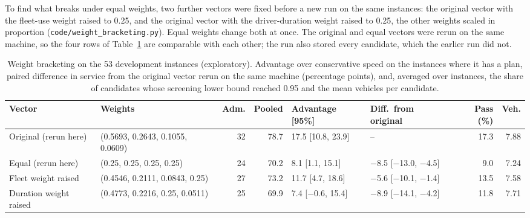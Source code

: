 To find what breaks under equal weights, two further vectors were fixed before a new run on the same instances: the original vector with the fleet-use weight raised to 0.25, and the original vector with the driver-duration weight raised to 0.25, the other weights scaled in proportion (\texttt{code/weight\_bracketing.py}). Equal weights change both at once. The original and equal vectors were rerun on the same machine, so the four rows of Table~\ref{tab:bracket} are comparable with each other; the run also stored every candidate, which the earlier run did not.

\begin{table}[htbp]
\centering
\scriptsize
\setlength{\tabcolsep}{4pt}
\caption{Weight bracketing on the 53 development instances (exploratory). Advantage over conservative speed on the instances where it has a plan, paired difference in service from the original vector rerun on the same machine (percentage points), and, averaged over instances, the share of candidates whose screening lower bound reached 0.95 and the mean vehicles per candidate.}
\label{tab:bracket}
\begin{tabular}{@{}l>{\raggedright\arraybackslash}p{2.9cm}rrllrr@{}}
\toprule
Vector & Weights & Adm. & Pooled & Advantage [95\%] & Diff.\ from original & Pass (\%) & Veh.\\
\midrule
Original (rerun here) & (0.5693, 0.2643, 0.1055, 0.0609) & 32 & 78.7 & 17.5 [10.8, 23.9] & -- & 17.3 & 7.88\\
Equal (rerun here) & (0.25, 0.25, 0.25, 0.25) & 24 & 70.2 & 8.1 [1.1, 15.1] & $-$8.5 [$-$13.0, $-$4.5] & 9.0 & 7.24\\
Fleet weight raised & (0.4546, 0.2111, 0.0843, 0.25) & 27 & 73.2 & 11.7 [4.7, 18.6] & $-$5.6 [$-$10.1, $-$1.4] & 13.5 & 7.58\\
Duration weight raised & (0.4773, 0.2216, 0.25, 0.0511) & 25 & 69.9 & 7.4 [$-$0.6, 15.4] & $-$8.9 [$-$14.1, $-$4.2] & 11.8 & 7.71\\
\bottomrule
\end{tabular}
\end{table}

